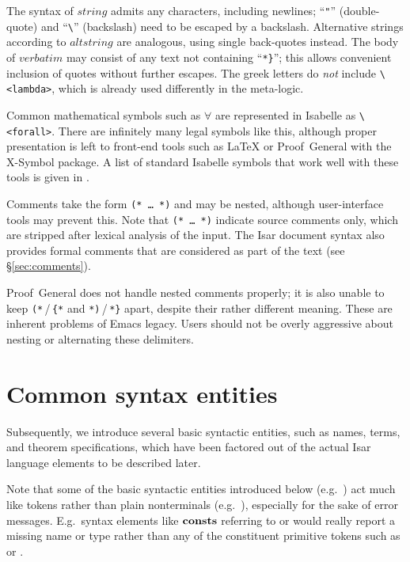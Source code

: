 The syntax of $string$ admits any characters, including newlines; ``\verb|"|''
(double-quote) and ``\verb|\|'' (backslash) need to be escaped by a backslash.
Alternative strings according to $altstring$ are analogous, using single
back-quotes instead.  The body of $verbatim$ may consist of any text not
containing ``\verb|*}|''; this allows convenient inclusion of quotes without
further escapes.  The greek letters do \emph{not} include \verb,\<lambda>,,
which is already used differently in the meta-logic.

Common mathematical symbols such as $\forall$ are represented in Isabelle as
\verb,\<forall>,.  There are infinitely many legal symbols like this, although
proper presentation is left to front-end tools such as {\LaTeX} or
Proof~General with the X-Symbol package.  A list of standard Isabelle symbols
that work well with these tools is given in \cite[appendix~A]{isabelle-sys}.

Comments take the form \texttt{(*~\dots~*)} and may be nested, although
user-interface tools may prevent this.  Note that \texttt{(*~\dots~*)}
indicate source comments only, which are stripped after lexical analysis of
the input.  The Isar document syntax also provides formal comments that are
considered as part of the text (see \S\ref{sec:comments}).

\begin{warn}
  Proof~General does not handle nested comments properly; it is also unable to
  keep \verb,(*,\,/\,\verb,{*, and \verb,*),\,/\,\verb,*}, apart, despite
  their rather different meaning.  These are inherent problems of Emacs
  legacy.  Users should not be overly aggressive about nesting or alternating
  these delimiters.
\end{warn}


\section{Common syntax entities}

Subsequently, we introduce several basic syntactic entities, such as names,
terms, and theorem specifications, which have been factored out of the actual
Isar language elements to be described later.

Note that some of the basic syntactic entities introduced below (e.g.\
) act much like tokens rather than plain nonterminals (e.g.\
), especially for the sake of error messages.  E.g.\ syntax
elements like ${\mathord{\mathbf{consts}}}$ referring to \railqtok{name} or \railqtok{type} would
really report a missing name or type rather than any of the constituent
primitive tokens such as \railtok{ident} or \railtok{string}.


